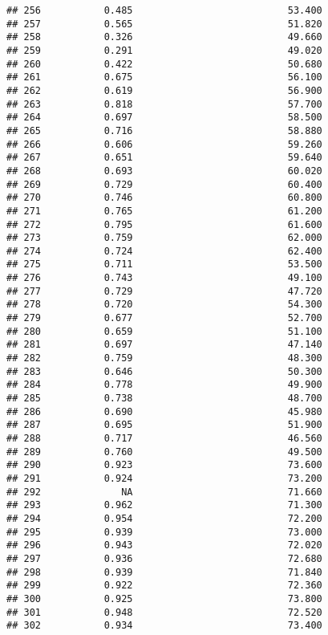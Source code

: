\documentclass[
]{article}
\begin{document}
\begin{verbatim}
## 256           0.485                           53.400
## 257           0.565                           51.820
## 258           0.326                           49.660
## 259           0.291                           49.020
## 260           0.422                           50.680
## 261           0.675                           56.100
## 262           0.619                           56.900
## 263           0.818                           57.700
## 264           0.697                           58.500
## 265           0.716                           58.880
## 266           0.606                           59.260
## 267           0.651                           59.640
## 268           0.693                           60.020
## 269           0.729                           60.400
## 270           0.746                           60.800
## 271           0.765                           61.200
## 272           0.795                           61.600
## 273           0.759                           62.000
## 274           0.724                           62.400
## 275           0.711                           53.500
## 276           0.743                           49.100
## 277           0.729                           47.720
## 278           0.720                           54.300
## 279           0.677                           52.700
## 280           0.659                           51.100
## 281           0.697                           47.140
## 282           0.759                           48.300
## 283           0.646                           50.300
## 284           0.778                           49.900
## 285           0.738                           48.700
## 286           0.690                           45.980
## 287           0.695                           51.900
## 288           0.717                           46.560
## 289           0.760                           49.500
## 290           0.923                           73.600
## 291           0.924                           73.200
## 292              NA                           71.660
## 293           0.962                           71.300
## 294           0.954                           72.200
## 295           0.939                           73.000
## 296           0.943                           72.020
## 297           0.936                           72.680
## 298           0.939                           71.840
## 299           0.922                           72.360
## 300           0.925                           73.800
## 301           0.948                           72.520
## 302           0.934                           73.400

\end{verbatim}
\end{document}
